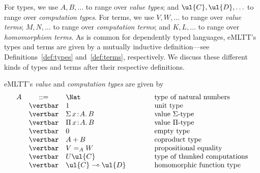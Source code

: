 For types, we use $A,B,\ldots$ to range over \emph{value types}; 
and $\ul{C},\ul{D},\ldots$ to range over \emph{computation types}. 
For terms, we use $V,W,\ldots$ to range over \emph{value terms}; 
$M,N,\ldots$ to range over \emph{computation terms}; 
and $K,L,\ldots$ to range over \emph{homomorphism terms}. 
As is common for dependently typed languages, eMLTT's types and terms are given by a mutually inductive definition---see Definitions~\ref{def:types} and~\ref{def:terms}, respectively.
We discuss these different kinds of types and terms after their respective definitions.

\begin{definition}
\label{def:types}
eMLTT's \emph{value} and \emph{computation types} are given by
\[
\begin{array}{r c l @{\qquad\qquad}l}
\index{ Nat@$\Nat$ (type of natural numbers)}
A & ::= & \Nat & \text{type of natural numbers}
\\
\index{ 1@$1$ (unit type)}
& \vertbar & 1 & \text{unit type}
\\
\index{ Sigma@$\Sigma \, x \hspace{-0.05cm}:\hspace{-0.05cm} A .\, B$ (value $\Sigma$-type)}
& \vertbar & \Sigma \, x \!:\! A .\, B & \text{value $\Sigma$-type}
\\
\index{ Product@$\Pi \, x \hspace{-0.05cm}:\hspace{-0.05cm} A .\, B$ (value $\Pi$-type)}
& \vertbar & \Pi \, x \!:\! A .\, B & \text{value $\Pi$-type}
\\
\index{ 0@$0$ (empty type)}
& \vertbar & 0 & \text{empty type}
\\
\index{ A@$A + B$ (coproduct type)}
& \vertbar & A + B & \text{coproduct type}
\\
\index{ V@$V =_A W$ (propositional equality)}
& \vertbar & V =_A W & \text{propositional equality}
\\
\index{ UC@$U \ul{C}$ (type of thunked computations)}
& \vertbar & U \ul{C} & \text{type of thunked computations}
\\
\index{ C@$\ul{C} \multimap \ul{D}$ (homomorphic function type)}
& \vertbar & \ul{C} \multimap \ul{D} & \text{homomorphic function type}
\index{type!computation --}
\\[5mm]

\end{array}\]
\end{definition}
